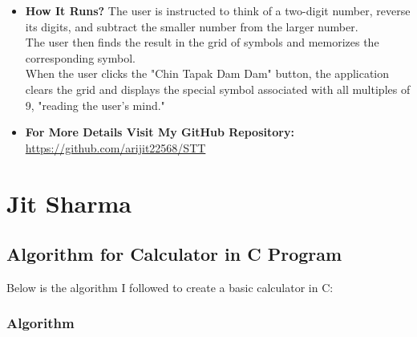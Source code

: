 \documentclass{article}
\begin{document}
\begin{itemize}
    \item \textbf{How It Runs?}
    The user is instructed to think of a two-digit number, reverse its digits, and subtract the smaller number from the larger number.\\

    The user then finds the result in the grid of symbols and memorizes the corresponding symbol.\\

    When the user clicks the "Chin Tapak Dam Dam" button, the application clears the grid and displays the special symbol associated with all multiples of 9, "reading the user's mind."\\ 

    \item \textbf{For More Details Visit My GitHub Repository:} \url{https://github.com/arijit22568/STT}
\end{itemize}
\newpage
\section{Jit Sharma}

\subsection{Algorithm for Calculator in C Program}

Below is the algorithm I followed to create a basic calculator in C:

\subsubsection*{Algorithm}
\end{document}
